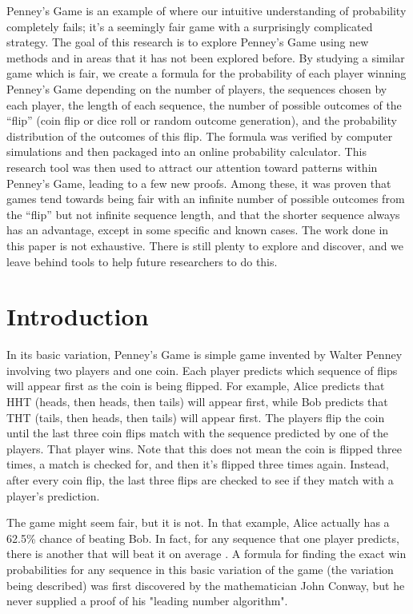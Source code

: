 \documentclass[english,12pt,a4paper,final]{article}
\begin{document}
Penney’s Game is an example of where our intuitive understanding of probability completely fails; it’s a seemingly fair game with a surprisingly complicated strategy. The goal of this research is to explore Penney’s Game using new methods and in areas that it has not been explored before. By studying a similar game which is fair, we create a formula for the probability of each player winning Penney’s Game depending on the number of players, the sequences chosen by each player, the length of each sequence, the number of possible outcomes of the “flip” (coin flip or dice roll or random outcome generation), and the probability distribution of the outcomes of this flip. The formula was verified by computer simulations and then packaged into an online probability calculator. This research tool was then used to attract our attention toward patterns within Penney's Game, leading to a few new proofs. Among these, it was proven that games tend towards being fair with an infinite number of possible outcomes from the “flip” but not infinite sequence length, and that the shorter sequence always has an advantage, except in some specific and known cases. The work done in this paper is not exhaustive. There is still plenty to explore and discover, and we leave behind tools to help future researchers to do this.

\part{Introduction}

In its basic variation, Penney's Game is simple game invented by Walter Penney involving two players and one coin. Each player predicts which sequence of flips will appear first as the coin is being flipped. For example, Alice predicts that HHT (heads, then heads, then tails) will appear first, while Bob predicts that THT (tails, then heads, then tails) will appear first. The players flip the coin until the last three coin flips match with the sequence predicted by one of the players. That player wins. Note that this does not mean the coin is flipped three times, a match is checked for, and then it's flipped three times again. Instead, after every coin flip, the last three flips are checked to see if they match with a player's prediction.

The game might seem fair, but it is not. In that example, Alice actually has a 62.5\% chance of beating Bob. In fact, for any sequence that one player predicts, there is another that will beat it on average \parencite{penney}. A formula for finding the exact win probabilities for any sequence in this basic variation of the game (the variation being described) was first discovered by the mathematician John Conway, but he never supplied a proof of his "leading number algorithm".
\end{document}
